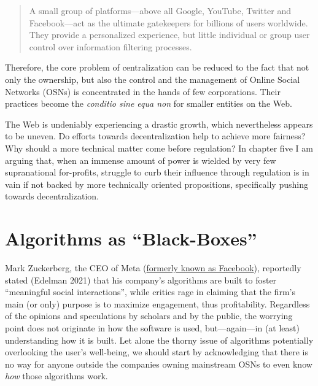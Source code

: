 \documentclass[
  a4paper,
]{book}
\begin{document}
\begin{quote}
A small group of platforms---above all Google, YouTube, Twitter and Facebook---act as the ultimate gatekeepers for billions of users worldwide. They provide a personalized experience, but little individual or group user control over information filtering processes.
\end{quote}

Therefore, the core problem of centralization can be reduced to the fact that not only the ownership, but also the control and the management of Online Social Networks (OSNs) is concentrated in the hands of few corporations. Their practices become the \emph{conditio sine equa non} for smaller entities on the Web.

The Web is undeniably experiencing a drastic growth, which nevertheless appears to be uneven. Do efforts towards decentralization help to achieve more fairness? Why should a more technical matter come before regulation? In chapter five I am arguing that, when an immense amount of power is wielded by very few supranational for-profits, struggle to curb their influence through regulation is in vain if not backed by more technically oriented propositions, specifically pushing towards decentralization.

\hypertarget{algorithms-as-black-boxes}{%
\section{Algorithms as ``Black-Boxes''}\label{algorithms-as-black-boxes}}

Mark Zuckerberg, the CEO of Meta (\href{https://about.fb.com/news/2021/10/facebook-company-is-now-meta/}{formerly known as Facebook}), reportedly stated {(Edelman 2021)} that his company's algorithms are built to foster ``meaningful social interactions'', while critics rage in claiming that the firm's main (or only) purpose is to maximize engagement, thus profitability. Regardless of the opinions and speculations by scholars and by the public, the worrying point does not originate in how the software is used, but---again---in (at least) understanding how it is built. Let alone the thorny issue of algorithms potentially overlooking the user's well-being, we should start by acknowledging that there is no way for anyone outside the companies owning mainstream OSNs to even know \emph{how} those algorithms work.
\end{document}
